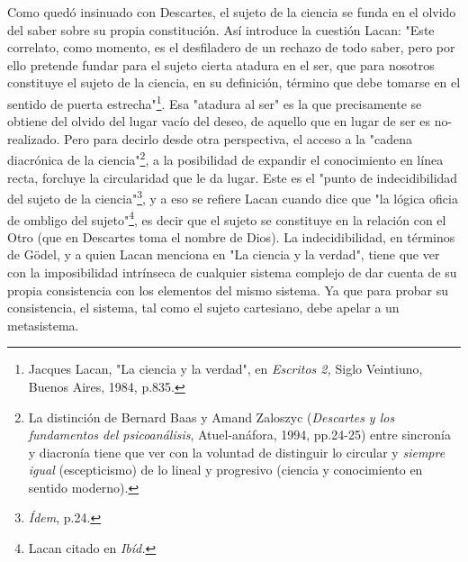 Como quedó insinuado con Descartes, el sujeto de la ciencia se funda en
el olvido del saber sobre su propia constitución. Así introduce la
cuestión Lacan: "Este correlato, como momento, es el desfiladero de un
rechazo de todo saber, pero por ello pretende fundar para el sujeto
cierta atadura en el ser, que para nosotros constituye el sujeto de la
ciencia, en su definición, término que debe tomarse en el sentido de
puerta estrecha"\footnote{Jacques Lacan, "La ciencia y la verdad", en
  \emph{Escritos 2,} Siglo Veintiuno, Buenos Aires, 1984, p.835.}. Esa
"atadura al ser" es la que precisamente se obtiene del olvido del lugar
vacío del deseo, de aquello que en lugar de ser es no-realizado. Pero
para decirlo desde otra perspectiva, el acceso a la "cadena diacrónica
de la ciencia"\footnote{La distinción de Bernard Baas y Amand Zaloszyc
  (\emph{Descartes y los fundamentos del psicoanálisis}, Atuel-anáfora,
  1994, pp.24-25) entre sincronía y diacronía tiene que ver con la
  voluntad de distinguir lo circular y \emph{siempre igual}
  (escepticismo) de lo lineal y progresivo (ciencia y conocimiento en
  sentido moderno).}, a la posibilidad de expandir el conocimiento en
línea recta, forcluye la circularidad que le da lugar. Este es el "punto
de indecidibilidad del sujeto de la ciencia"\footnote{\emph{Ídem}, p.24.},
y a eso se refiere Lacan cuando dice que "la lógica oficia de ombligo
del sujeto"\footnote{Lacan citado en \emph{Ibíd.}}, es decir que el
sujeto se constituye en la relación con el Otro (que en Descartes toma
el nombre de Dios). La indecidibilidad, en términos de Gödel, y a quien
Lacan menciona en "La ciencia y la verdad", tiene que ver con la
imposibilidad intrínseca de cualquier sistema complejo de dar cuenta de
su propia consistencia con los elementos del mismo sistema. Ya que para
probar su consistencia, el sistema, tal como el sujeto cartesiano, debe
apelar a un metasistema.

